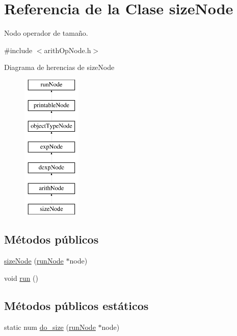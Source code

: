 \hypertarget{classsizeNode}{\section{Referencia de la Clase size\-Node}
\label{classsizeNode}
}


Nodo operador de tamaño.  




{\ttfamily \#include $<$arith\-Op\-Node.\-h$>$}

Diagrama de herencias de size\-Node\begin{figure}[H]
\begin{center}
\leavevmode
\includegraphics[height=7.000000cm]{classsizeNode}
\end{center}
\end{figure}
\subsection*{Métodos públicos}
\begin{DoxyCompactItemize}
\item 
\hyperlink{classsizeNode_a841399c380ef88f758a1ba572f2f6d35}{size\-Node} (\hyperlink{classrunNode}{run\-Node} $\ast$node)
\item 
void \hyperlink{classsizeNode_a86d4ed29e9587ed49b34da8bd742898a}{run} ()
\end{DoxyCompactItemize}
\subsection*{Métodos públicos estáticos}
\begin{DoxyCompactItemize}
\item 
static num \hyperlink{classsizeNode_a53010206228a82a553ee7c824514fc1b}{do\-\_\-size} (\hyperlink{classrunNode}{run\-Node} $\ast$node)
\end{DoxyCompactItemize}

